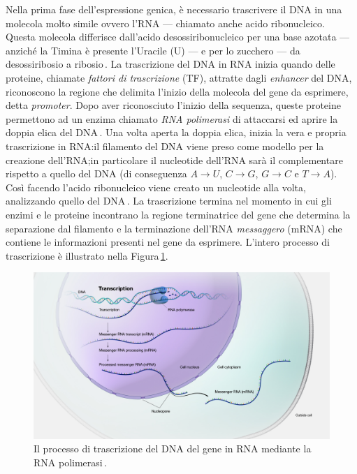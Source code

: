 Nella prima fase dell'espressione genica, è necessario trascrivere il \acs{DNA} in una molecola molto simile ovvero l'\acs{RNA} — chiamato anche acido ribonucleico. Questa molecola differisce dall'acido desossiribonucleico per una base azotata — anziché la Timina è presente l'Uracile (U) — e per lo zucchero — da desossiribosio a ribosio\,\cite{alberts2002dna}. La trascrizione del \acs{DNA} in \acs{RNA} inizia quando delle proteine, chiamate \textsl{fattori di trascrizione} (\acs{TF}), attratte dagli \textit{enhancer} del \acs{DNA}, riconoscono la regione che delimita l'inizio della molecola del gene da esprimere, detta \textit{promoter}. Dopo aver riconosciuto l'inizio della sequenza, queste proteine permettono ad un enzima chiamato \textsl{\acs{RNA} polimerasi} di attaccarsi ed aprire la doppia elica del \acs{DNA}\,\cite{cramer2019organization}. Una volta aperta la doppia elica, inizia la vera e propria trascrizione in \acs{RNA}:\@ il filamento del \acs{DNA} viene preso come modello per la creazione dell'\acs{RNA};\@ in particolare il nucleotide dell'\acs{RNA} sarà il complementare rispetto a quello del \acs{DNA} (di conseguenza $A\rightarrow U$, $C\rightarrow G$, $G\rightarrow C$ e $T\rightarrow A$). Così facendo l'acido ribonucleico viene creato un nucleotide alla volta, analizzando quello del \acs{DNA}\,\cite{alberts2002dna}. La trascrizione termina nel momento in cui gli enzimi e le proteine incontrano la regione terminatrice del gene che determina la separazione dal filamento e la terminazione dell'\acs{RNA} \textsl{messaggero} (\acs{mRNA}) che contiene le informazioni presenti nel gene da esprimere. L'intero processo di trascrizione è illustrato nella Figura\,\ref{fig:dna-transcription}.

\begin{figure}[b!]
    \centering
    \includegraphics[width=\textwidth]{assets/imgs/dna-transcription.jpg}
    \caption[Il processo di trascrizione del \acs{DNA} in \acs{RNA}.]{Il processo di trascrizione del \acs{DNA} del gene in \acs{RNA} mediante la \acs{RNA} polimerasi\,\cite{nhgri_transcription_image}.}\label{fig:dna-transcription}
\end{figure}

